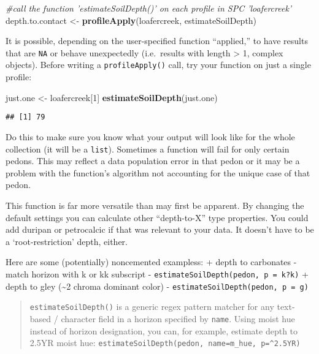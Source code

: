 \documentclass[]{article}
\newenvironment{Shaded}{\begin{snugshade}}{\end{snugshade}}
\newcommand{\KeywordTok}[1]{\textcolor[rgb]{0.13,0.29,0.53}{\textbf{#1}}}
\newcommand{\DecValTok}[1]{\textcolor[rgb]{0.00,0.00,0.81}{#1}}
\newcommand{\StringTok}[1]{\textcolor[rgb]{0.31,0.60,0.02}{#1}}
\newcommand{\CommentTok}[1]{\textcolor[rgb]{0.56,0.35,0.01}{\textit{#1}}}
\newcommand{\NormalTok}[1]{#1}
\begin{document}
\begin{Shaded}
\begin{Highlighting}[]
\CommentTok{#call the function 'estimateSoilDepth()' on each profile in SPC 'loafercreek'}
\NormalTok{depth.to.contact <-}\StringTok{ }\KeywordTok{profileApply}\NormalTok{(loafercreek, estimateSoilDepth)}
\end{Highlighting}
\end{Shaded}

It is possible, depending on the user-specified function ``applied,'' to
have results that are \texttt{NA} or behave unexpectedly (i.e.~results
with length \textgreater{} 1, complex objects). Before writing a
\texttt{profileApply()} call, try your function on just a single
profile:

\begin{Shaded}
\begin{Highlighting}[]
\NormalTok{just.one <-}\StringTok{ }\NormalTok{loafercreek[}\DecValTok{1}\NormalTok{]}
\KeywordTok{estimateSoilDepth}\NormalTok{(just.one)}
\end{Highlighting}
\end{Shaded}

\begin{verbatim}
## [1] 79
\end{verbatim}

Do this to make sure you know what your output will look like for the
whole collection (it will be a \texttt{list}). Sometimes a function will
fail for only certain pedons. This may reflect a data population error
in that pedon or it may be a problem with the function's algorithm not
accounting for the unique case of that pedon.

This function is far more versatile than may first be apparent. By
changing the default settings you can calculate other ``depth-to-X''
type properties. You could add duripan or petrocalcic if that was
relevant to your data. It doesn't have to be a `root-restriction' depth,
either.

Here are some (potentially) noncemented exampless: + depth to carbonates
- match horizon with k or kk subscript -
\texttt{estimateSoilDepth(pedon,\ p\ =\ \textquotesingle{}k?k\textquotesingle{})}
+ depth to gley (\textasciitilde{}2 chroma dominant color) -
\texttt{estimateSoilDepth(pedon,\ p\ =\ \textquotesingle{}g\textquotesingle{})}

\begin{quote}
\texttt{estimateSoilDepth()} is a generic regex pattern matcher for any
text-based / character field in a horizon specified by \texttt{name}.
Using moist hue instead of horizon designation, you can, for example,
estimate depth to 2.5YR moist hue:
\texttt{estimateSoilDepth(pedon,\ name=\textquotesingle{}m\_hue\textquotesingle{},\ p=\textquotesingle{}\^{}2.5YR\textquotesingle{})}
\end{quote}
\end{document}
